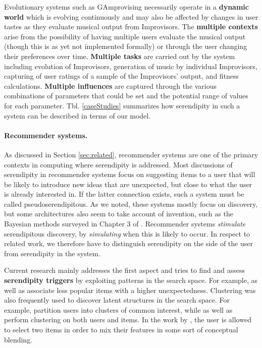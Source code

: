 Evolutionary systems such as GAmprovising necessarily operate in a \textbf{dynamic world} which is evolving continuously and may also be affected by changes in user tastes as they evaluate musical output from Improvisors. The \textbf{multiple contexts} arise from the possibility of having multiple users evaluate the musical output (though this is as yet not implemented formally) or through the user changing their preferences over time. \textbf{Multiple tasks} are carried out by the system including evolution of Improvisors, generation of music by individual Improvisors, capturing of user ratings of a sample of the Improvisors' output, and fitness calculations. \textbf{Multiple influences} are captured through the various combinations of parameters that could be set and the potential range of values for each parameter. Tbl. \ref{caseStudies} summarizes how serendipity in such a system can be described in terms of our model.


\paragraph{Recommender systems.} 
As discussed in Section \ref{sec:related}, recommender systems are one
of the primary contexts in computing where serendipity is addressed. Most discussions of serendipity in recommender systems focus on suggesting items to a user that will be likely to introduce new ideas that are unexpected, but close to what the user is already interested in. If the latter connection exists, such a system must be called pseudoserendipitous. As we noted, these systems mostly focus on discovery, but some architectures also seem to take account of invention, such as the Bayesian methods surveyed in Chapter 3 of . Recommender systems \emph{stimulate} serendipitous discovery, by \emph{simulating} when this is likely to occur. In respect to related work, we therefore have to distinguish serendipity on the side of the user from serendipity in the system. 

Current research mainly addresses the first aspect and tries to find and assess \textbf{serendipity triggers} by exploiting patterns in the search space. For example, \cite{Herlocker2004} as well as \cite{Lu2012} associate less popular items with a higher unexpectedness. Clustering was also frequently used to discover latent structures in the search space. For example, \cite{Kamahara2005} partition users into clusters of common interest, while \cite{Onuma2009} as well as \cite{Zhang2011} perform clustering on both users and items. In the work by \cite{Oku2011}, the user is allowed to select two items in order to mix their features in some sort of conceptual blending.

